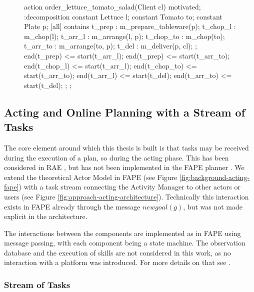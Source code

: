 \begin{figure}
  \begin{anmlcode}
  action order_lettuce_tomato_salad(Client cl) {
    motivated;
    :decomposition {
      constant Lettuce l;
      constant Tomato to;
      constant Plate p;
      [all] contains {
        t_prep : m_prepare_tableware(p);
        t_chop_l : m_chop(l);
        t_arr_l : m_arrange(l, p);
        t_chop_to : m_chop(to);
        t_arr_to : m_arrange(to, p);
        t_del : m_deliver(p, cl);
      };
      end(t_prep) <= start(t_arr_l);
      end(t_prep) <= start(t_arr_to);
      end(t_chop_l) <= start(t_arr_l);
      end(t_chop_to) <= start(t_arr_to);
      end(t_arr_l) <= start(t_del);
      end(t_arr_to) <= start(t_del);
    };
  };
  \end{anmlcode}
  \label{lst:approach-order}
\end{figure}

\subsection{Acting and Online Planning with a Stream of Tasks}
\label{sec:approach-acting}

The core element around which this thesis is built is that tasks may be received during the execution of a plan, so during the acting phase.
This has been considered in RAE \citep{ghallabAutomatedPlanningActing2016}, but has not been implemented in the FAPE planner \citep{bit-monnotTemporalHierarchicalModels2016a}.
We extend the theoretical Actor Model in FAPE (see Figure \ref{fig:background-acting-fape}) with a task stream connecting the Activity Manager to other actors or users (see Figure \ref{fig:approach-acting-architecture}).
Technically this interaction exists in FAPE already through the message $newgoal(g)$, but was not made explicit in the architecture.



The interactions between the components are implemented as in FAPE using message passing, with each component being a state machine.
The observation database and the execution of skills are not considered in this work, as no interaction with a platform was introduced.
For more details on that see \cite{bit-monnotTemporalHierarchicalModels2016a}.

\subsubsection{Stream of Tasks}


